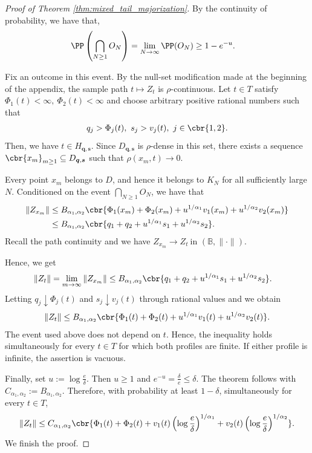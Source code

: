 \documentclass[11pt]{article}
\begin{document}
\begin{proof}[Proof of Theorem
\ref{thm:mixed_tail_majorization}]
By the continuity of probability, we have that,
\begin{align*}
\PP\left(
\bigcap_{N\ge1}O_N
\right)
&=
\lim_{N\to\infty}\PP(O_N)\ge
1-e^{-u}.
\end{align*}

Fix an outcome in this event. By the null-set modification made at the
beginning of the appendix, the sample path $t\mapsto Z_t$ is
$\rho$-continuous. Let $t\in T$ satisfy $\Phi_1(t)<\infty,
\ 
\Phi_2(t)<\infty$ and choose arbitrary positive rational numbers such that
\begin{align*}
q_j>\Phi_j(t),
\ 
s_j>v_j(t),
\  j\in\cbr{1,2}.
\end{align*}
Then, we have $t\in H_{\boldsymbol q,\boldsymbol s}$.
Since $D_{\boldsymbol q,\boldsymbol s}$ is $\rho$-dense in this set,
there exists a sequence $\cbr{x_m}_{m\ge1}
\subseteq
D_{\boldsymbol q,\boldsymbol s}$ such that $\rho(x_m,t)\rightarrow0$.

Every point $x_m$ belongs to $D$, and hence it belongs to $K_N$ for
all sufficiently large $N$. Conditioned on the event
$\bigcap_{N\ge1}O_N$, we have that
\begin{align*}
\|Z_{x_m}\|
&\le
B_{\alpha_1,\alpha_2}
\cbr{
\Phi_1(x_m)+\Phi_2(x_m)
+
u^{1/\alpha_1}v_1(x_m)
+
u^{1/\alpha_2}v_2(x_m)
}\\
&\le
B_{\alpha_1,\alpha_2}
\cbr{
q_1+q_2
+
u^{1/\alpha_1}s_1
+
u^{1/\alpha_2}s_2
}.
\end{align*}
Recall the path continuity and we have
$Z_{x_m}\rightarrow Z_t
\ 
\text{in }(\mathbb B,\|\cdot\|)$.

Hence, we get
\begin{align*}
\|Z_t\|
&=
\lim_{m\to\infty}\|Z_{x_m}\|\le
B_{\alpha_1,\alpha_2}
\cbr{
q_1+q_2
+
u^{1/\alpha_1}s_1
+
u^{1/\alpha_2}s_2
}.
\end{align*}
Letting $q_j\downarrow\Phi_j(t)$ and
$s_j\downarrow v_j(t)$ through rational values and we obtain
\begin{align*}
\|Z_t\|
\le
B_{\alpha_1,\alpha_2}
\cbr{
\Phi_1(t)+\Phi_2(t)
+
u^{1/\alpha_1}v_1(t)
+
u^{1/\alpha_2}v_2(t)
}.
\end{align*}
The event used above does not depend on $t$. Hence, the inequality
holds simultaneously for every $t\in T$ for which both profiles are
finite. If either profile is infinite, the assertion is vacuous.

Finally, set $u:=\log\frac{e}{\delta}$.
Then $u\ge1$ and $e^{-u}
=
\frac{\delta}{e}
\le
\delta.$
The theorem follows with
$C_{\alpha_1,\alpha_2}:=B_{\alpha_1,\alpha_2}$.
Therefore, with probability at least $1-\delta$, simultaneously for
every $t\in T$,
\begin{align*}
\|Z_t\|
\le
C_{\alpha_1,\alpha_2}
\cbr{
\Phi_1(t)+\Phi_2(t)
+
v_1(t)
\left(
\log\frac{e}{\delta}
\right)^{1/\alpha_1}
+
v_2(t)
\left(
\log\frac{e}{\delta}
\right)^{1/\alpha_2}
}.
\end{align*}
We finish the proof.
\end{proof}
\end{document}
